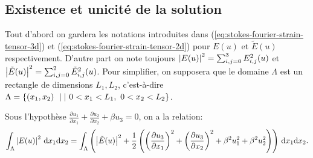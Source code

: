 \subsection{Existence et unicité de la solution}
Tout d'abord on gardera les notations introduites dans
(\ref{eq:stokes-fourier-strain-tensor-3d}) et
(\ref{eq:stokes-fourier-strain-tensor-2d}) pour $E(u)$ et $\tilde E(u)$
respectivement. D'autre part on note toujours $\left\lvert E(u) \right\rvert^2 =
\sum_{i,j = 0}^3E_{i,j}^2(u)$ et $\left\lvert \tilde E(u) \right\rvert^2 = \sum_{i,j =
  0}^2\tilde E_{i,j}^2(u)$. Pour simplifier, on supposera que le
domaine $\Lambda$ est un rectangle de dimensions $L_1,L_2$,
c'est-à-dire $\Lambda = \left\{ (x_1, x_2) \ \mid|\ 
  0<x_1<L_1,\ 0<x_2<L_2 \right\}$.

\begin{lemme}\label{lem:lemme-1}
  Sous l'hypothèse $\frac{\partial u_1}{\partial x_1} +
  \frac{\partial u_2}{\partial x_2} + \beta u_3 = 0$, on a la
  relation:
  \begin{equation}
    \int_\Lambda \abs{E(u)}^2\,\mathrm dx_1\mathrm dx_2 %
    = \int_\Lambda \parent{\abs{\tilde E(u)}^2 %
      + \frac{1}{2}\parent{  \parent{\frac{\partial u_3}{\partial x_1}}^2 %
                           + \parent{\frac{\partial u_3}{\partial x_2}}^2 %
                           + \beta^2 u_1^2 %
                           + \beta^2 u_2^2}}\,\mathrm dx_1\mathrm dx_2.
  \end{equation}
\end{lemme}

